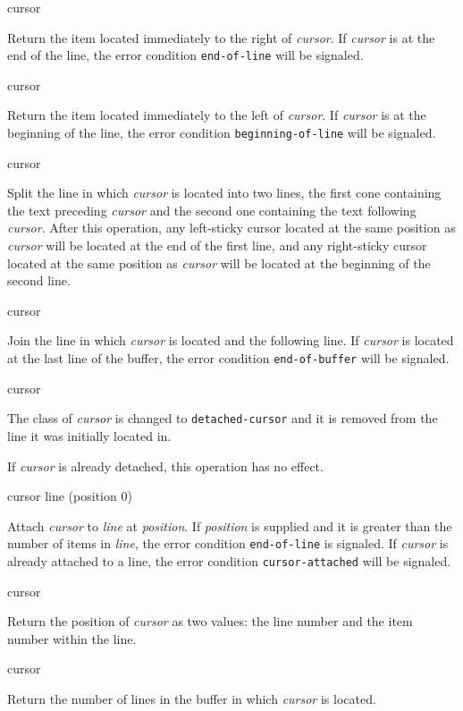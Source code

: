  {cursor}

Return the item located immediately to the right of \textit{cursor}.
If \emph{cursor} is at the end of the line, the error condition
\texttt{end-of-line} will be signaled.

 {cursor}

Return the item located immediately to the left of \textit{cursor}.
If \emph{cursor} is at the beginning of the line, the error condition
\texttt{beginning-of-line} will be signaled.

 {cursor}

Split the line in which \textit{cursor} is located into two lines, the
first cone containing the text preceding \textit{cursor} and the
second one containing the text following \textit{cursor}.  After this
operation, any left-sticky cursor located at the same position as
\textit{cursor} will be located at the end of the first line, and any
right-sticky cursor located at the same position as \textit{cursor}
will be located at the beginning of the second line.

 {cursor}

Join the line in which \textit{cursor} is located and the following
line.  If \textit{cursor} is located at the last line of the buffer,
the error condition \texttt{end-of-buffer} will be signaled.

 {cursor}

The class of \textit{cursor} is changed to \texttt{detached-cursor}
and it is removed from the line it was initially located in. 

If \textit{cursor} is already detached, this operation has no effect.

 {cursor line \optional (position 0)}

Attach \textit{cursor} to \textit{line} at \textit{position}.  If
\textit{position} is supplied and it is greater than the number of
items in \textit{line}, the error condition \texttt{end-of-line} is
signaled.  If \textit{cursor} is already attached to a line, the error
condition \texttt{cursor-attached} will be signaled.

 {cursor}

Return the position of \textit{cursor} as two values: the line number
and the item number within the line. 

 {cursor}

Return the number of lines in the buffer in which \textit{cursor} is
located.

